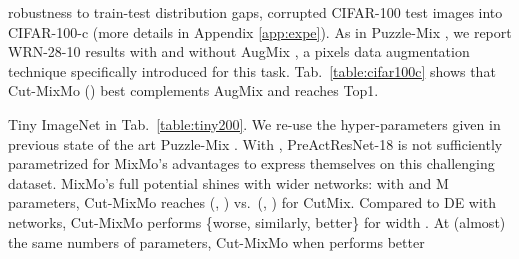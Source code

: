 \documentclass[10pt,twocolumn,letterpaper]{article}
\begin{document}
robustness to train-test distribution gaps, \cite{hendrycks2018benchmarking}
corrupted CIFAR-100 test images into CIFAR-100-c (more details in Appendix \ref{app:expe}).
As in Puzzle-Mix \cite{kim2020puzzle}, we report WRN-28-10 results with and
without AugMix \cite{hendrycks2019augmix}, a pixels data augmentation technique
specifically introduced for this task. Tab.~\ref{table:cifar100c} shows that Cut-MixMo () best complements AugMix and reaches  Top1.\begin{table}[!b]\vspace{-0.5em}\caption{\textbf{Robustness comparison on CIFAR-100-c}.}\centering {}\label{table:cifar100c}\end{table}%
Tiny ImageNet \cite{chrabaszcz2017} in Tab.~\ref{table:tiny200}. We re-use the hyper-parameters given in previous state of the art Puzzle-Mix \cite{kim2020puzzle}. With , PreActResNet-18 \cite{preacthe} is not sufficiently parametrized for MixMo's advantages to express themselves on this challenging dataset. MixMo's full potential shines with wider networks: with  and M parameters, Cut-MixMo reaches (, ) vs.\ (, ) for CutMix. Compared to DE with  networks,
Cut-MixMo performs \{worse, similarly, better\} for width . At (almost) the
same numbers of parameters, Cut-MixMo when  performs better
\end{document}
